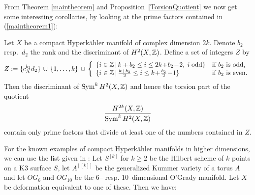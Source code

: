 From Theorem \ref{maintheorem} and Proposition~\ref{TorsionQuotient} we now get some interesting corollaries, by looking at the prime factors contained in (\ref{maintheorem1}):
\begin{corollary}
Let $X$ be a compact Hyperk\"ahler manifold of complex dimension $2k$. Denote $b_2$ resp.~$d_2$ the rank and the discriminant of $H^2(X,\mathbb{Z})$. Define a set of integers $Z$ by
$$
Z \coloneqq \{c_X^{b_2} d_2\} \,\cup\, \{1,\ldots ,k\} \,\cup\, \left\{
\begin{array}{*2{l}p{5cm}}
 \{i \in\Z\,|\,k+b_2 \leq i \leq 2k\!+\!b_2\!-\!2,\; i\; \text{odd}\}   &\text{if }b_2\text{ is odd}, \\
 \{i\in\Z \,|\, \frac{k+b_2}{2}\leq i \leq k\!+\!\frac{b_2}{2}\!-\!1\}   &\text{if }b_2\text{ is even}.
\end{array}
\right.
$$
Then the discriminant of $\operatorname{Sym}^kH^2(X,\mathbb{Z})$ and hence the torsion part of the quotient
$$
\frac{H^{2k}(X,\mathbb{Z})}{\operatorname{Sym}^kH^2(X,\mathbb{Z})}
$$
contain only prime factors that divide at least one of the numbers contained in $Z$.
\end{corollary}
For the known examples of compact Hyperk\"ahler manifolds in higher dimensions, we can use the list given in \cite[Table~1]{OGrady}:
Let $S^{[k]}$ for $k\geq 2$ be the Hilbert scheme of $k$ points on a K3 surface $S$, let $A^{[[k]]}$ be the generalized Kummer variety of a torus $A$ and let $OG_6$ and $OG_{10}$ be the 6-- resp. 10--dimensional O'Grady manifold. Let $X$ be deformation equivalent to one of these. Then we have:


